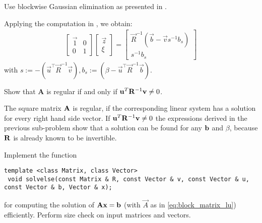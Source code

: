 \begin{problem}
\begin{subproblem}[2]
  \begin{hint}
   Use blockwise Gaussian elimination as presented in . 
  \end{hint}


\begin{solution}
Applying the computation in , we obtain:
  \begin{align*}
   \begin{bmatrix}
      \vec{1} & 0 \\
      0  & 1
   \end{bmatrix} \begin{bmatrix} \vec{z} \\ \xi \end{bmatrix} = \begin{bmatrix}
   \vec{R}^{-1} ( \vec{b} - \vec{v} s^{-1} b_s )\\
   s^{-1} b_s
   \end{bmatrix}
  \end{align*}
    with $s := - (\vec{u}^\top \vec{R}^{-1} \vec{v}), b_{s} := (\beta - \vec{u}^\top \vec{R}^{-1} \vec{b})$.
\end{solution}
\end{subproblem}

\begin{subproblem}[2]
  Show that $\mathbf{A}$ is regular if and only if ${\mathbf{u}}^{T}\mathbf{R}^{-1}{\mathbf{v}}\neq0$.
  \begin{solution}
    The square matrix ${\mathbf{A}}$ is regular, if the corresponding linear system has a
    solution for every right hand side vector. If ${\mathbf{u}}^{T}\mathbf{R}^{-1}{\mathbf{v}}\neq0$
    the expressions derived in the previous sub-problem show that a solution
    can be found for any ${\mathbf{b}}$ and $\beta$, because ${\mathbf{R}}$ is already known to be
    invertible.
  \end{solution}
\end{subproblem}
  
\begin{subproblem}[3]
\label{subprb:PartitionedMatrix_d}
Implement the \Cpp{} function
\begin{lstlisting}[style=cppsimple]
 template <class Matrix, class Vector>
 void solvelse(const Matrix & R, const Vector & v, const Vector & u, const Vector & b, Vector & x);
\end{lstlisting}
for computing the solution of $\mathbf{A}{\mathbf{x}}={\mathbf{b}}$ (with $\vec{A}$ as in 
\eqref{eq:block_matrix_lu}) efficiently. Perform size check on input matrices and vectors. 


\end{subproblem}
\end{problem}
